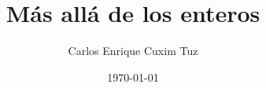 \documentclass[notheorems, handout, xcolor=table]{beamer}
\title{Más allá de los enteros}
\author{Carlos Enrique Cuxim Tuz}
\institute{Universidad Autónoma de Yucatán\\ Facultad de Matemáticas}
\date{\today}
\begin{document}
  \frame{\titlepage}

  
\end{document}
